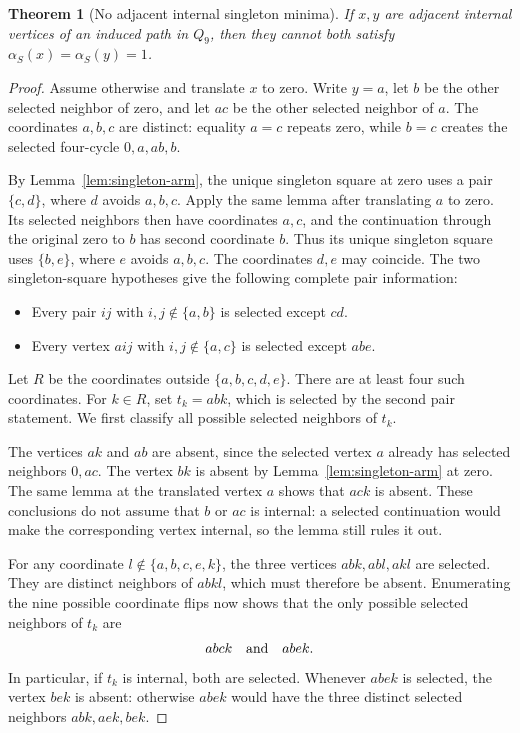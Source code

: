 \documentclass[11pt,a4paper]{article}
\newtheorem{theorem}{Theorem}[section]
\theoremstyle{definition}
\theoremstyle{remark}
\newcommand{\Q}{Q}
\begin{document}
\begin{theorem}[No adjacent internal singleton minima]\label{thm:no-adjacent-singletons}
If $x,y$ are adjacent internal vertices of an induced path in $\Q_9$, then they cannot both satisfy $\alpha_S(x)=\alpha_S(y)=1$.
\end{theorem}
\begin{proof}
Assume otherwise and translate $x$ to zero. Write $y=a$, let $b$ be the other selected neighbor of zero, and let $ac$ be the other selected neighbor of $a$. The coordinates $a,b,c$ are distinct: equality $a=c$ repeats zero, while $b=c$ creates the selected four-cycle $0,a,ab,b$.

By Lemma~\ref{lem:singleton-arm}, the unique singleton square at zero uses a pair $\{c,d\}$, where $d$ avoids $a,b,c$. Apply the same lemma after translating $a$ to zero. Its selected neighbors then have coordinates $a,c$, and the continuation through the original zero to $b$ has second coordinate $b$. Thus its unique singleton square uses $\{b,e\}$, where $e$ avoids $a,b,c$. The coordinates $d,e$ may coincide. The two singleton-square hypotheses give the following complete pair information:
\begin{itemize}
\item Every pair $ij$ with $i,j\notin\{a,b\}$ is selected except $cd$.
\item Every vertex $aij$ with $i,j\notin\{a,c\}$ is selected except $abe$.
\end{itemize}

Let $R$ be the coordinates outside $\{a,b,c,d,e\}$. There are at least four such coordinates. For $k\in R$, set $t_k=abk$, which is selected by the second pair statement. We first classify all possible selected neighbors of $t_k$.

The vertices $ak$ and $ab$ are absent, since the selected vertex $a$ already has selected neighbors $0,ac$. The vertex $bk$ is absent by Lemma~\ref{lem:singleton-arm} at zero. The same lemma at the translated vertex $a$ shows that $ack$ is absent. These conclusions do not assume that $b$ or $ac$ is internal: a selected continuation would make the corresponding vertex internal, so the lemma still rules it out.

For any coordinate $l\notin\{a,b,c,e,k\}$, the three vertices $abk,abl,akl$ are selected. They are distinct neighbors of $abkl$, which must therefore be absent. Enumerating the nine possible coordinate flips now shows that the only possible selected neighbors of $t_k$ are
\[
abck\quad\hbox{and}\quad abek.
\]
In particular, if $t_k$ is internal, both are selected. Whenever $abek$ is selected, the vertex $bek$ is absent: otherwise $abek$ would have the three distinct selected neighbors $abk,aek,bek$.


\end{proof}
\end{document}
